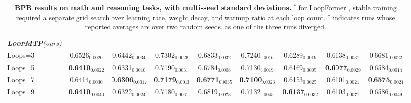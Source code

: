 \begin{table}[t]
{\begin{tabular}{
        l |
        c c c c c c c c
        }
        \rowcolor{lightgray} \textit{\textbf{\textsc{LoopMTP}}\small(ours)\normalsize} &&&&&&&&\\
        \rowcolor{lightgray} \quad Loops=3 & 0.6526$_{0.0020}$ & 0.6442$_{0.0034}$ & 0.7302$_{0.0029}$ & 0.6833$_{0.0032}$ & 0.7240$_{0.0016}$ & 0.6289$_{0.0019}$ & 0.6138$_{0.0031}$ & 0.6681$_{0.0022}$\\
        \rowcolor{lightgray} \quad Loops=5 & \textbf{0.6410$_{0.0022}$} & 0.6331$_{0.0010}$ & 0.7190$_{0.0031}$ & \underline{0.6784}$_{0.0008}$ & \underline{0.7130}$_{0.0019}$ & 0.6169$_{0.0005}$ & \textbf{0.6077$_{0.0029}$} & \underline{0.6584}$_{0.0014}$\\
        \rowcolor{lightgray} \quad Loops=7 & \underline{0.6414}$_{0.0030}$ & \textbf{0.6306$_{0.0017}$} & \textbf{0.7179$_{0.0013}$} & \textbf{0.6771$_{0.0035}$} & \textbf{0.7100$_{0.0023}$} & \underline{0.6153}$_{0.0025}$ & \underline{0.6101}$_{0.0021}$ & \textbf{0.6575$_{0.0021}$}\\
        \rowcolor{lightgray} \quad Loops=9 & \textbf{0.6410$_{0.0040}$} & \underline{0.6322}$_{0.0024}$ & \underline{0.7180}$_{0.0061}$ & 0.6819$_{0.0073}$ & 0.7132$_{0.0045}$ & \textbf{0.6137$_{0.0032}$} & 0.6103$_{0.0071}$ & 0.6586$_{0.0049}$\\
    \bottomrule
    \end{tabular}
    }
    \caption{\textbf{BPB results on math and reasoning tasks, with multi-seed standard deviations.}
    $^*$ for LoopFormer \cite{jeddi2026loopformer}, stable training required a separate grid search over learning rate, weight decay, and warmup ratio at each loop count. $^\dagger$ indicates runs whose reported averages are over two random seeds, as one of the three runs diverged.}
    \label{tab:bpb_math_results}
\end{table}


